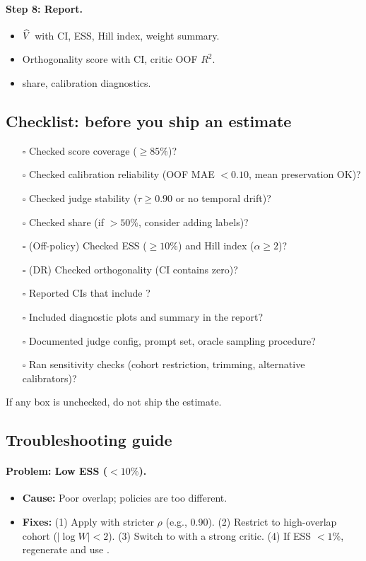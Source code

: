 \paragraph{Step 8: Report.}
\begin{itemize}
\item $\widehat{V}$ with CI, ESS, Hill index, weight summary.
\item Orthogonality score with CI, critic OOF $R^2$.
\item \oua{} share, calibration diagnostics.
\end{itemize}

\subsection{Checklist: before you ship an estimate}

\begin{enumerate}
\item[$\square$] Checked score coverage ($\ge 85\%$)?
\item[$\square$] Checked calibration reliability (OOF MAE $< 0.10$, mean preservation OK)?
\item[$\square$] Checked judge stability ($\tau \ge 0.90$ or no temporal drift)?
\item[$\square$] Checked \oua{} share (if $> 50\%$, consider adding labels)?
\item[$\square$] (Off-policy) Checked ESS ($\ge 10\%$) and Hill index ($\alpha \ge 2$)?
\item[$\square$] (DR) Checked orthogonality (CI contains zero)?
\item[$\square$] Reported CIs that include \oua?
\item[$\square$] Included diagnostic plots and summary in the report?
\item[$\square$] Documented judge config, prompt set, oracle sampling procedure?
\item[$\square$] Ran sensitivity checks (cohort restriction, trimming, alternative calibrators)?
\end{enumerate}

If any box is unchecked, do not ship the estimate.

\subsection{Troubleshooting guide}

\paragraph{Problem: Low ESS ($< 10\%$).}
\begin{itemize}
\item \textbf{Cause:} Poor overlap; policies are too different.
\item \textbf{Fixes:} (1) Apply \simcal{} with stricter $\rho$ (e.g., 0.90). (2) Restrict to high-overlap cohort ($|\log W| < 2$). (3) Switch to \dr{} with a strong critic. (4) If ESS $< 1\%$, regenerate and use \dm.
\end{itemize}

